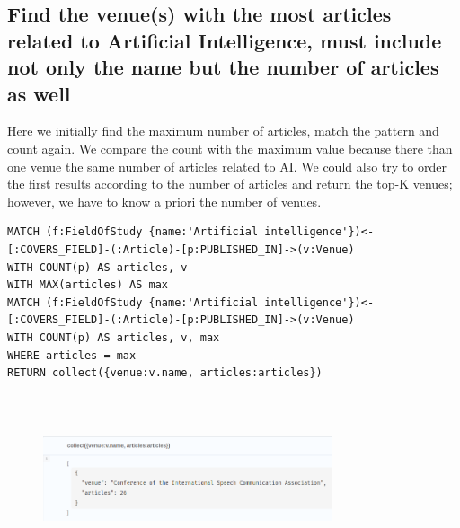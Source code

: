 \documentclass{Configuration_Files/PoliMi3i_thesis}
\begin{document}
\subsection{Find the venue(s) with the most articles related to Artificial Intelligence, must include not only the name but the number of articles as well}
Here we initially find the maximum number of articles, match the pattern and count again. We compare the count with the maximum value because there than one venue the same number of articles related to AI. We could also try to order the first results according to the number of articles and return the top-K venues; however, we have to know a priori the number of venues.\\
\begin{lstlisting}[language=cypher, label=lst:cypher-example]
MATCH (f:FieldOfStudy {name:'Artificial intelligence'})<-[:COVERS_FIELD]-(:Article)-[p:PUBLISHED_IN]->(v:Venue)
WITH COUNT(p) AS articles, v
WITH MAX(articles) AS max
MATCH (f:FieldOfStudy {name:'Artificial intelligence'})<-[:COVERS_FIELD]-(:Article)-[p:PUBLISHED_IN]->(v:Venue)
WITH COUNT(p) AS articles, v, max
WHERE articles = max
RETURN collect({venue:v.name, articles:articles})
\end{lstlisting}
\begin{figure}[H]
    \centering
        \includegraphics[width=85mm, height=50mm]{Images/query_5.png}
        \caption{}
    \label{fig:quadtree}
\end{figure}
\end{document}
